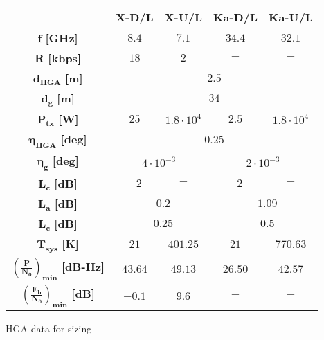 \vspace{3mm}
\begin{minipage}{0.5\linewidth}
    \centering
    \captionsetup{type=table}
    \renewcommand{\arraystretch}{2}
    \setlength\extrarowheight{-1pt}
    \begin{tabular}{|c|c|c|c|c|}
        \hline
        & \textbf{X-D/L} & \textbf{X-U/L} & \textbf{Ka-D/L}& \textbf{Ka-U/L} \\
        \hline
        $\boldsymbol{f}$ \textbf{[GHz]} & $8.4$ & $7.1$ & $34.4$ & $32.1$ \\
        \hline
        $\boldsymbol{R}$ \textbf{[kbps]} & $18$ & $2$ & $-$ & $-$ \\
        \hline
        $\boldsymbol{d_{HGA}}$ \textbf{[m]} &\multicolumn{4}{c|}{$2.5$} \\
        \hline
        $\boldsymbol{d_{g}}$ \textbf{[m]} &\multicolumn{4}{c|}{$34$} \\
        \hline
        $\boldsymbol{P_{tx}}$ \textbf{[W]} & $25$ & $1.8 \cdot 10^{4}$ & $2.5$ & $1.8 \cdot 10^{4}$ \\
        \hline
        $\boldsymbol{\eta_{HGA}}$ \textbf{[deg]} &\multicolumn{4}{c|}{$0.25$} \\
        \hline
        $\boldsymbol{\eta_{g}}$ \textbf{[deg]} &\multicolumn{2}{c|}{$4 \cdot 10^{-3}$} & \multicolumn{2}{c|}{$2 \cdot 10^{-3}$}\\
        \hline
        $\boldsymbol{L_c}$ \textbf{[dB]} & $-2$ & $-$ & $-2$ & $-$ \\
        \hline
        $\boldsymbol{L_{a}}$ \textbf{[dB]} &\multicolumn{2}{c|}{$-0.2$} & \multicolumn{2}{c|}{$-1.09$}\\
        \hline
        $\boldsymbol{L_{c}}$ \textbf{[dB]} &\multicolumn{2}{c|}{$-0.25$} & \multicolumn{2}{c|}{$-0.5$}\\
        \hline
        $\boldsymbol{T_{sys}}$ \textbf{[K]} & $21$ & $401.25$ & $21$ & $770.63$ \\
        \hline
        $\boldsymbol{\left(\frac{P}{N_0}\right)_{min}}$ \textbf{[dB-Hz]} & $43.64$ & $49.13$ & $26.50$ & $42.57$ \\
        \hline
        $\boldsymbol{\left(\frac{E_b}{N_0}\right)_{min}}$ \textbf{[dB]} & $-0.1$ & $9.6$ & $-$ & $-$ \\
        \hline
    \end{tabular}
    \caption{HGA data for sizing \cite{juno_telecommunication}}
    \label{table:dati_HGA}
\end{minipage}\hfill
